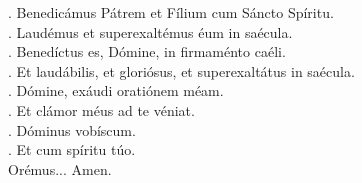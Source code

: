 \setlength{\parindent}{0in}
\Vbar . Benedicámus Pátrem et Fílium cum Sáncto Spíritu.\\
\Rbar . Laudémus et superexaltémus éum in saécula.\\
\Vbar . Benedíctus es, Dómine, in firmaménto caéli.\\
\Rbar . Et  laudábilis, et gloriósus, et superexaltátus in saécula.\\
\Vbar . Dómine, exáudi oratiónem méam.\\
\Rbar . Et clámor méus ad te véniat.\\
\Vbar . Dóminus vobíscum.\\
\Rbar . Et cum spíritu túo.\\
Orémus... Amen.
